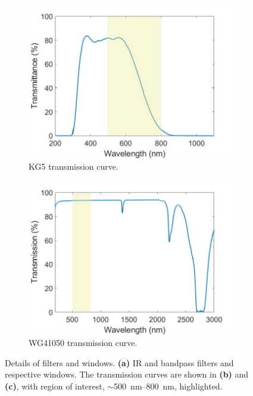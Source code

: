 \begin{figure} [h]
        \begin{subfigure}{.48\textwidth}
            \centering
            \includegraphics[width=\textwidth]{pictures/kg5_highlight.png}
            \caption{KG5 transmission curve.}
        \end{subfigure}
      \hfill
        \begin{subfigure}{.48\textwidth}
            \centering
            \includegraphics[width=\textwidth]{pictures/uvfs_highlight.png}
            \caption{WG41050 transmission curve.}
        \end{subfigure}
    
    \caption{Details of filters and windows. \textbf{(a)} IR and bandpass filters and respective windows. The transmission curves are shown in \textbf{(b)} and \textbf{(c)}, with region of interest, $\sim$\SI{500}{nm}--\SI{800}{nm}, highlighted.}
    \label{fig:expsetup:windows}
\end{figure}

